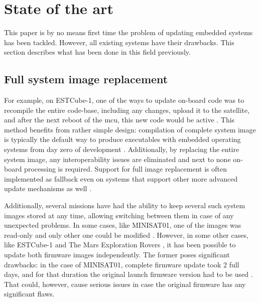 \newpage
\section{State of the art}

This paper is by no means first time the problem of updating embedded systems has been tackled. However, all existing systems have their drawbacks. This section describes what has been done in this field previously.

\subsection{Full system image replacement}

For example, on ESTCube-1, one of the ways to update on-board code was to recompile the entire code-base, including any changes, upload it to the satellite, and after the next reboot of the \gls{mcu}, this new code would be active \cite{Suenter2016}. This method benefits from rather simple design: compilation of complete system image is typically the default way to produce executables with embedded operating systems from day zero of development . Additionally, by replacing the entire system image, any interoperability issues are eliminated and next to none on-board processing is required. Support for full image replacement is often implemented as fallback even on systems that support other more advanced update mechanisms as well \cite{Tarbe2013,Greco2005,Garrido1998}.

Additionally, several missions have had the ability to keep several such system images stored at any time, allowing switching between them in case of any unexpected problems. In some cases, like MINISAT01, one of the images was read-only and only other one could be modified \cite{Garrido1998}. However, in some other cases, like  ESTCube-1 \cite{Tarbe2013} and The Mars Exploration Rovers \cite{Greco2005}, it has been possible to update both firmware images independently. The former poses significant drawbacks: in the case of MINISAT01, complete firmware update took 2 full days, and for that duration the original launch firmware version had to be used \cite{Garrido1998}. That could, however, cause serious issues in case the original firmware has any significant flaws.


